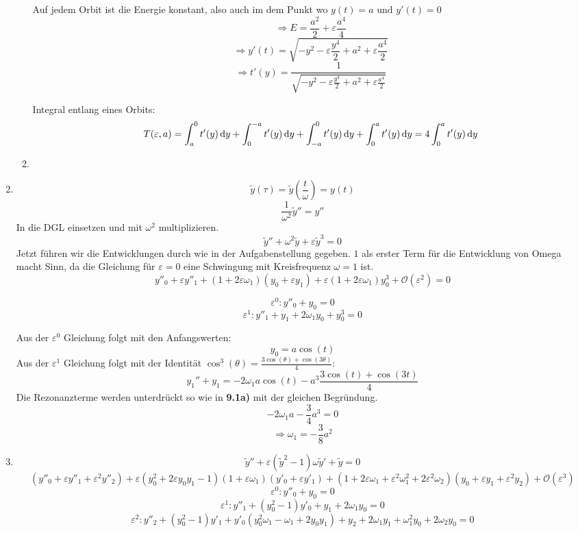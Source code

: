 \documentclass[a4paper,11pt]{scrartcl}
\newcommand*{\eps}{\varepsilon}
\newcommand*{\Ld}{\mathcal{O}}
\newcommand*{\yt}{\tilde{y}}
\newcommand*{\dy}{\dif{}y}
\begin{document}
\begin{enumerate}[label*=\textbf{9.\arabic*.}]
\begin{enumerate}
    Auf jedem Orbit ist die Energie konstant, also auch im dem Punkt wo $y(t) =
    a \text{ und } y'(t) = 0$
    \[\Rightarrow E = \frac{a^2}{2}+\eps \frac{a^4}{4}\]
    \[\Rightarrow y'(t) = \sqrt{-y^2 - \eps \frac{y^4}{2} + a^2 + \eps \frac{a^4}{2}}\]
    \[\Rightarrow t'(y) = \frac{1}{\sqrt{-y^2 - \eps \frac{y^4}{2} + a^2 + \eps \frac{a^4}{2}}}\]

    Integral entlang eines Orbits:
    \[T(\eps, a) = \int_a^0 t'(y) \dy + \int_0^{-a} t'(y) \dy + \int_{-a}^0
      t'(y) \dy + \int_0^a t'(y) \dy = 4 \int_0^a t'(y) \dy\]
  \item
\end{enumerate}


\item
  \[\yt(\tau) = \yt\left(\frac{t}{\omega}\right)= y(t)\]
  \[\frac{1}{\omega^2} \yt'' = y''\]
  In die DGL einsetzen und mit $\omega^2$ multiplizieren.
  \[\yt'' + \omega^2 \yt + \eps \yt^3 = 0\]
  Jetzt führen wir die Entwicklungen durch wie in der Aufgabenstellung gegeben.
  $1$ als erster Term für die Entwicklung von Omega macht Sinn, da die Gleichung
  für $\eps=0$ eine Schwingung mit Kreisfrequenz $\omega=1$ ist.
  \[y''_0 + \eps y''_1 + (1 + 2 \eps \omega_1)(y_0 + \eps y_1) + \eps 
(1 + 2 \eps \omega_1) y^3_0 + \Ld(\eps^2)= 0\]

  \[\eps^0: y''_0 + y_0 = 0\]
  \[\eps^1: y''_1 + y_1 + 2 \omega_1 y_0 + y_0^3 = 0\]

  Aus der $\eps^0$ Gleichung folgt mit den Anfangswerten:
  \[y_0 = a \cos(t)\]
  Aus der $\eps^1$ Gleichung folgt mit der Identität $\cos^3(\theta) = \frac{3
    \cos(\theta) + \cos(3 \theta)}{4}$:
  \[y_1'' + y_1 = -2 \omega_1 a \cos(t) - a^3 \frac{3 \cos(t) + \cos(3t)}{4}\]
  Die Rezonanzterme werden unterdrückt so wie in \textbf{9.1a)} mit der gleichen
  Begründung.
  \[-2\omega_1 a - \frac{3}{4} a^3 = 0\]
  \[\Rightarrow \omega_1 = -\frac{3}{8} a^2\]


\item
  \[ \yt'' + \eps(\yt^2 - 1) \omega \yt' + \yt = 0\]
  \[ (y''_0 + \eps y''_1 + \eps^2 y''_2) + \eps (y^2_0 + 2 \eps y_0 y_1 - 1) (1
    + \eps \omega_1) (y'_0 + \eps y'_1) + (1 + 2 \eps \omega_1 + \eps^2 \omega^2_1
    + 2 \eps^2 \omega_2)
    (y_0 + \eps y_1 + \eps^2 y_2) + \Ld(\eps^3)\]
  \[ \eps^0: y''_0 + y_0 = 0\]
  \[ \eps^1: y''_1 + (y^2_0-1) y'_0 + y_1 + 2 \omega_1 y_0 = 0 \]
  \[ \eps^2: y''_2 + (y_0^2-1) y'_1 + y'_0 (y_0^2 \omega_1 - \omega_1 + 2 y_0 y_1)  + y_2 + 2 \omega_1 y_1 + \omega^2_1 y_0 + 2\omega_2 y_0 = 0\]


\end{enumerate}
\end{document}
